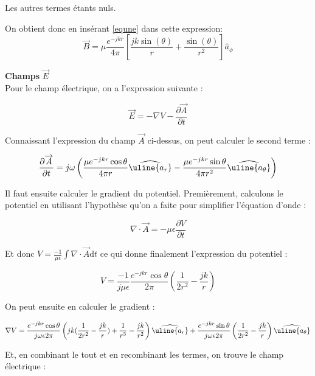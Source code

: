 \documentclass[10pt,a4paper]{article}
\newcommand{\PDeriv}[2]{\frac{\partial#1}{\partial#2}} %
\newcommand{\V}[1]{\overrightarrow{#1}}
\newcommand{\Base}[1]{\widehat{\uline{a_{#1}}}} %
\begin{document}
Les autres termes étants nuls.

On obtient donc en insérant \ref{equne} dans cette expression:
$$\overrightarrow{B}= \mu\dfrac{e^{-jkr}}{4\pi} \left[ \dfrac{jk \sin (\theta )}{r} + \dfrac{\sin (\theta )}{r^2} \right]\widehat{a}_{\phi} $$


\indent \textbf{Champs} $\overrightarrow{E}$\\

Pour le champ électrique, on a l'expression suivante : 

\begin{equation}
\overrightarrow{E} = - \nabla V - \PDeriv{\overrightarrow{A}}{t}
\end{equation}

Connaissant l'expression du champ $\V{A}$ ci-dessus, on peut calculer le second terme :

\begin{equation}
\PDeriv{\V{A}}{t} = j \omega \left( \frac{\mu e^{-jkr} \cos \theta}{4 \pi r} \Base{r} - \frac{\mu e^{-jkr} \sin \theta}{4 \pi r^2} \Base{\theta} \right)
\end{equation}

Il faut ensuite calculer le gradient du potentiel. Premièrement, calculons le potentiel en utilisant l'hypothèse qu'on a faite pour simplifier l'équation d'onde :

\begin{equation}
\nabla \cdot \V{A} = - \mu \epsilon \PDeriv{V}{t}
\end{equation}

Et donc $V = \frac{-1}{\mu \epsilon} \int \nabla \cdot \V{A} \mathrm{d}t$ ce qui donne finalement l'expression du potentiel :

\begin{equation}
V = \frac{-1}{j \mu \epsilon} \frac{e^{-jkr} \cos \theta}{2 \pi} \left( \frac{1}{2r^2} - \frac{jk}{r} \right)
\end{equation}

On peut ensuite en calculer le gradient :

\begin{equation}
\nabla V = \frac{e^{-jkr} \cos \theta}{j \omega \epsilon 2 \pi} \left( jk(\frac{1}{2r^2} - \frac{jk}{r}) + \frac{1}{r^3} - \frac{jk}{r^2} \right) \Base{r} + \frac{e^{-jkr} \sin \theta }{j \omega \epsilon 2 \pi} \left( \frac{1}{2r^2} - \frac{jk}{r} \right) \Base{\theta}
\end{equation}

Et, en combinant le tout et en recombinant les termes, on trouve le champ électrique :
\end{document}
